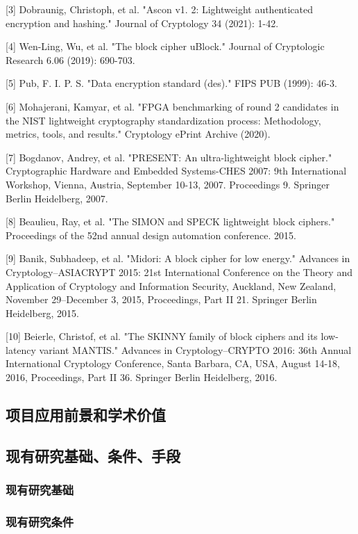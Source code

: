 \documentclass{ctexart}
\begin{document}
[3] Dobraunig, Christoph, et al. "Ascon v1. 2: Lightweight authenticated encryption and hashing." Journal of Cryptology 34 (2021): 1-42.

[4] Wen-Ling, Wu, et al. "The block cipher uBlock." Journal of Cryptologic Research 6.06 (2019): 690-703.

[5] Pub, F. I. P. S. "Data encryption standard (des)." FIPS PUB (1999): 46-3.

[6] Mohajerani, Kamyar, et al. "FPGA benchmarking of round 2 candidates in the NIST lightweight cryptography standardization process: Methodology, metrics, tools, and results." Cryptology ePrint Archive (2020).

[7] Bogdanov, Andrey, et al. "PRESENT: An ultra-lightweight block cipher." Cryptographic Hardware and Embedded Systems-CHES 2007: 9th International Workshop, Vienna, Austria, September 10-13, 2007. Proceedings 9. Springer Berlin Heidelberg, 2007.

[8] Beaulieu, Ray, et al. "The SIMON and SPECK lightweight block ciphers." Proceedings of the 52nd annual design automation conference. 2015.

[9] Banik, Subhadeep, et al. "Midori: A block cipher for low energy." Advances in Cryptology–ASIACRYPT 2015: 21st International Conference on the Theory and Application of Cryptology and Information Security, Auckland, New Zealand, November 29--December 3, 2015, Proceedings, Part II 21. Springer Berlin Heidelberg, 2015.

[10] Beierle, Christof, et al. "The SKINNY family of block ciphers and its low-latency variant MANTIS." Advances in Cryptology–CRYPTO 2016: 36th Annual International Cryptology Conference, Santa Barbara, CA, USA, August 14-18, 2016, Proceedings, Part II 36. Springer Berlin Heidelberg, 2016.

\subsection{项目应用前景和学术价值}
\subsection{现有研究基础、条件、手段}
\subsubsection{现有研究基础}
\subsubsection{现有研究条件}
\end{document}
